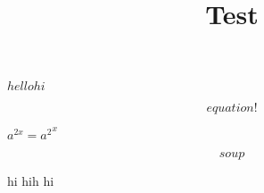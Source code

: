 \documentclass{article}
\title{
  Test
}
\begin{document}
\maketitle


\section{}

\(hello hi\)

\[
  equation!
\]

\(a^{2x} = {a^2}^x\)

\begin{equation}
\label{eq:2}
  soup
\end{equation}

hi hih hi
\end{document}
